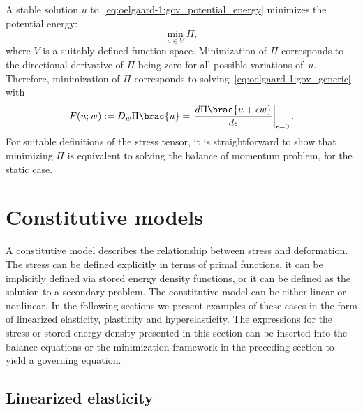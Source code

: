 A stable solution $u$ to~\eqref{eq:oelgaard-1:gov_potential_energy}
minimizes the potential energy:
\begin{equation}
  \min_{u \in V} \Pi,
\end{equation}
where $V$ is a suitably defined function space.  Minimization of $\Pi$
corresponds to the directional derivative of $\Pi$ being zero for all
possible variations of~$u$.  Therefore, minimization of $\Pi$ corresponds
to solving~\eqref{eq:oelgaard-1:gov_generic} with
\begin{equation}
\label{eq:oelgaard-1:gov_energy_variation}
  F(u; w) := D_{w} \Pi\brac{u}
      = \left. \frac{d \Pi\brac{u + \epsilon w}}{d \epsilon} \right|_{\epsilon = 0}.
\end{equation}
For suitable definitions of the stress tensor, it is straightforward
to show that minimizing $\Pi$ is equivalent to solving the balance of
momentum problem, for the static case.

\section{Constitutive models}

A constitutive model describes the relationship between stress and
deformation.  The stress can be defined explicitly in terms of primal
functions, it can be implicitly defined via stored energy density
functions, or it can be defined as the solution to a secondary problem.
The constitutive model can be either linear or nonlinear.  In the
following sections we present examples of these cases in the form of
linearized elasticity, plasticity and hyperelasticity.  The expressions
for the stress or stored energy density presented in this section can
be inserted into the balance equations or the minimization framework in
the preceding section to yield a governing equation.

\subsection{Linearized elasticity}
\label{sec:oelgaard-1:lin_elasticity}

